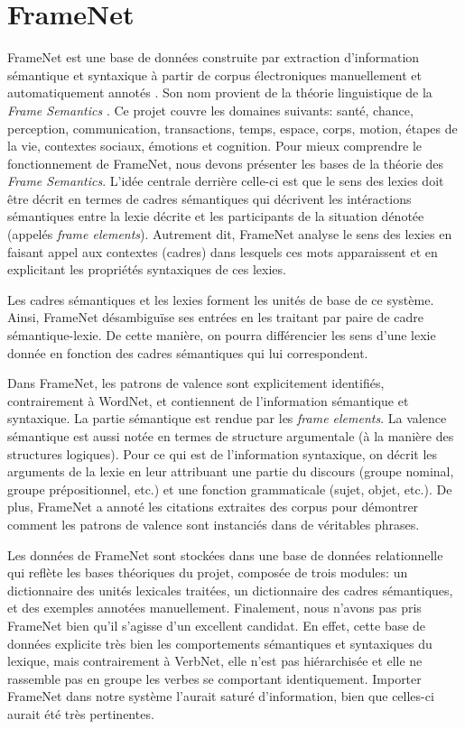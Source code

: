 \section{FrameNet}
FrameNet est une base de données construite par extraction d'information sémantique et syntaxique à partir de corpus électroniques manuellement et automatiquement annotés \citep{FillmoreBackgroundFramenet2003a}. Son nom provient de la théorie linguistique de la \emph{Frame Semantics} \citep{BakerBerkeleyFrameNetProject1998}. Ce projet couvre les domaines suivants: santé, chance, perception, communication, transactions, temps, espace, corps, motion, étapes de la vie, contextes sociaux, émotions et cognition. Pour mieux comprendre le fonctionnement de FrameNet, nous devons présenter les bases de la théorie des \emph{Frame Semantics}. L'idée centrale derrière celle-ci est que le sens des lexies doit être décrit en termes de cadres sémantiques qui décrivent les intéractions sémantiques entre la lexie décrite et les participants de la situation dénotée (appelés \emph{frame elements}). Autrement dit, FrameNet analyse le sens des lexies en faisant appel aux contextes (cadres) dans lesquels ces mots apparaissent et en explicitant les propriétés syntaxiques de ces lexies.

Les cadres sémantiques et les lexies forment les unités de base de ce système. Ainsi, FrameNet désambiguïse ses entrées en les traitant par paire de cadre sémantique-lexie. De cette manière, on pourra différencier les sens d'une lexie donnée en fonction des cadres sémantiques qui lui correspondent.

Dans FrameNet, les patrons de valence sont explicitement identifiés, contrairement à WordNet, et contiennent de l'information sémantique et syntaxique. La partie sémantique est rendue par les \emph{frame elements}. La valence sémantique est aussi notée en termes de structure argumentale (à la manière des structures logiques). Pour ce qui est de l'information syntaxique, on décrit les arguments de la lexie en leur attribuant une partie du discours (groupe nominal, groupe prépositionnel, etc.) et une fonction grammaticale (sujet, objet, etc.). De plus, FrameNet a annoté les citations extraites des corpus pour démontrer comment les patrons de valence sont instanciés dans de véritables phrases.

Les données de FrameNet sont stockées dans une base de données relationnelle qui reflète les bases théoriques du projet, composée de trois modules: un dictionnaire des unités lexicales traitées, un dictionnaire des cadres sémantiques, et des exemples annotées manuellement. Finalement, nous n'avons pas pris FrameNet bien qu'il s'agisse d'un excellent candidat. En effet, cette base de données explicite très bien les comportements sémantiques et syntaxiques du lexique, mais contrairement à VerbNet, elle n'est pas hiérarchisée et elle ne rassemble pas en groupe les verbes se comportant identiquement. Importer FrameNet dans notre système l'aurait saturé d'information, bien que celles-ci aurait été très pertinentes.

